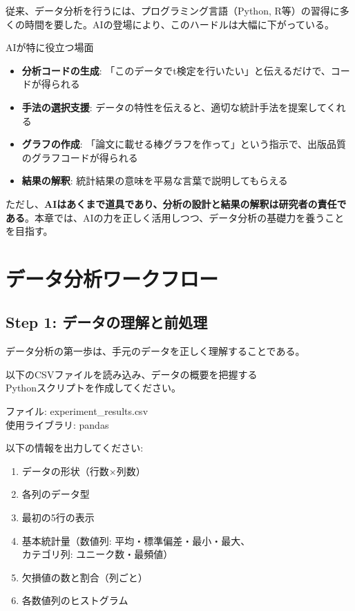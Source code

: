 従来、データ分析を行うには、プログラミング言語（Python, R等）の習得に多くの時間を要した。AIの登場により、このハードルは大幅に下がっている。

\begin{itembox}[l]{AIが特に役立つ場面}
\begin{itemize}
\item \textbf{分析コードの生成}: 「このデータでt検定を行いたい」と伝えるだけで、コードが得られる
\item \textbf{手法の選択支援}: データの特性を伝えると、適切な統計手法を提案してくれる
\item \textbf{グラフの作成}: 「論文に載せる棒グラフを作って」という指示で、出版品質のグラフコードが得られる
\item \textbf{結果の解釈}: 統計結果の意味を平易な言葉で説明してもらえる
\end{itemize}
\end{itembox}

ただし、\textbf{AIはあくまで道具であり、分析の設計と結果の解釈は研究者の責任である}。本章では、AIの力を正しく活用しつつ、データ分析の基礎力を養うことを目指す。

\section{データ分析ワークフロー}

\subsection{Step 1: データの理解と前処理}

データ分析の第一歩は、手元のデータを正しく理解することである。

\begin{promptbox}
以下のCSVファイルを読み込み、データの概要を把握する\\
Pythonスクリプトを作成してください。

ファイル: experiment\_results.csv\\
使用ライブラリ: pandas

以下の情報を出力してください:
\begin{enumerate}
\item データの形状（行数×列数）
\item 各列のデータ型
\item 最初の5行の表示
\item 基本統計量（数値列: 平均・標準偏差・最小・最大、\\
カテゴリ列: ユニーク数・最頻値）
\item 欠損値の数と割合（列ごと）
\item 各数値列のヒストグラム
\end{enumerate}
\end{promptbox}

